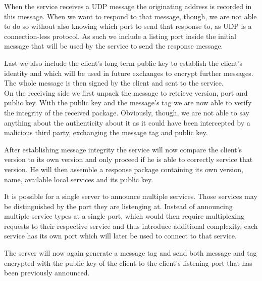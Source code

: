 When the service receives a UDP message the originating address is recorded in this message.
When we want to respond to that message, though, we are not able to do so without also knowing which port to send that response to, as UDP is a connection-less protocol.
As such we include a listing port inside the initial message that will be used by the service to send the response message.

Last we also include the client's long term public key to establish the client's identity and which will be used in future exchanges to encrypt further messages.
The whole message is then signed by the client and sent to the service.\\

On the receiving side we first unpack the message to retrieve version, port and public key.
With the public key and the message's tag we are now able to verify the integrity of the received package.
Obviously, though, we are not able to say anything about the authenticity about it as it could have been intercepted by a malicious third party, exchanging the message tag and public key.

After establishing message integrity the service will now compare the client's version to its own version and only proceed if he is able to correctly service that version.
He will then assemble a response package containing its own version, name, available local services and its public key.

It is possible for a single server to announce multiple services.
Those services may be distinguished by the port they are listenging at.
Instead of announcing multiple service types at a single port, which would then require multiplexing requests to their respective service and thus introduce additional complexity, each service has its own port which will later be used to connect to that service.

The server will now again generate a message tag and send both message and tag encrypted with the public key of the client to the client's listening port that has been previously announced.

